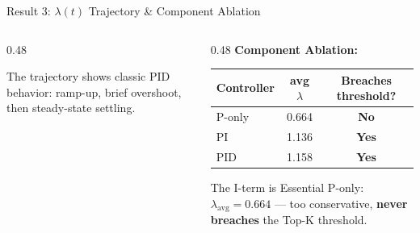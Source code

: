 \documentclass[aspectratio=169, 11pt]{beamer}
\begin{document}
\begin{frame}{Result 3: $\lambda(t)$ Trajectory \& Component Ablation}

\begin{columns}[T]
\begin{column}{0.48\textwidth}
\begin{center}
\end{center}

\vspace{0.2em}
{\small The trajectory shows classic PID behavior: ramp-up, brief overshoot, then steady-state settling.}
\end{column}

\begin{column}{0.48\textwidth}
\textbf{Component Ablation:}

\vspace{0.3em}
\begin{table}
\centering\small
\begin{tabular}{lcc}
  \toprule
  Controller & avg $\lambda$ & Breaches threshold? \\
  \midrule
  P-only & 0.664 & \color{alertred}\textbf{No} \\
  PI & 1.136 & \color{basegreen}\textbf{Yes} \\
  PID & 1.158 & \color{basegreen}\textbf{Yes} \\
  \bottomrule
\end{tabular}
\end{table}

\vspace{0.3em}
\begin{alertblock}{The I-term is Essential}
\small
P-only: $\lambda_\text{avg}{=}0.664$ --- too conservative, \textbf{never breaches} the Top-K threshold.


\end{alertblock}
\end{column}
\end{columns}
\end{frame}
\end{document}

